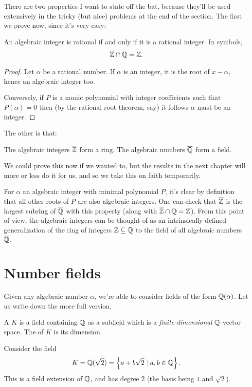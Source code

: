 There are two properties I want to state off the bat,
because they'll be used extensively in the tricky
(but nice) problems at the end of the section.
The first we prove now, since it's very easy:
\begin{proposition}
	An algebraic integer is rational
	if and only if it is a rational integer.
	In symbols, \[ \overline{\mathbb Z} \cap \mathbb Q = \mathbb Z. \]
\end{proposition}
\begin{proof}
	Let $\alpha$ be a rational number.
	If $\alpha$ is an integer, it is the root of $x-\alpha$,
	hence an algebraic integer too.

	Conversely, if $P$ is a monic polynomial with integer
	coefficients such that $P(\alpha) = 0$ then
	(by the rational root theorem, say)
	it follows $\alpha$ must be an integer.
\end{proof}
The other is that:
\begin{proposition}
	The algebraic integers $\overline{\mathbb Z}$ form a ring.
	The algebraic numbers $\overline{\mathbb Q}$ form a field.
\end{proposition}
We could prove this now if we wanted to,
but the results in the next chapter will more or less
do it for us, and so we take this on faith temporarily.

\begin{remark}
	For $\alpha$ an algebraic integer with minimal
	polynomial $P$, it's clear by definition that all
	other roots of $P$ are also algebraic integers. One
	can check that $\overline{\mathbb Z}$ is the largest subring of $\overline{\mathbb Q}$
	with this property (along with $\overline{\mathbb Z} \cap \mathbb Q = \mathbb Z$).
	From this point of view, the algebraic
	integers can be thought of as an intrinsically-defined
	generalization of the ring of integers $\mathbb Z \subseteq
	\mathbb Q$ to the field of all algebraic numbers $\overline{\mathbb Q}$.
\end{remark}

\section{Number fields}

Given any algebraic number $\alpha$,
we're able to consider fields of the form $\mathbb Q(\alpha)$.
Let us write down the more full version.

\begin{definition}
	A  $K$ is a field containing $\mathbb Q$ as a subfield
	which is a \emph{finite-dimensional} $\mathbb Q$-vector space.
	The  of $K$ is its dimension.
\end{definition}
\begin{example}
	Consider the field
	\[ K = \mathbb Q(\sqrt2) = \left\{ a+b\sqrt2 \mid a,b \in \mathbb Q \right\}. \]
	This is a field extension of $\mathbb Q$,
	and has degree $2$ (the basis being $1$ and $\sqrt2$).
\end{example}

